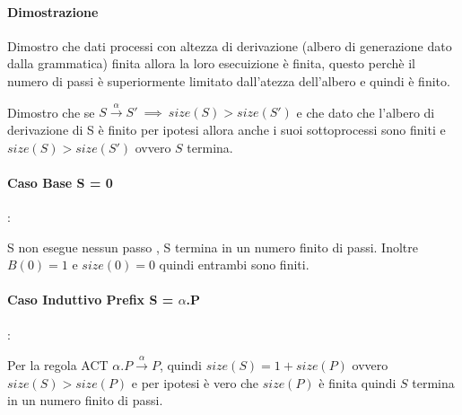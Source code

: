 \documentclass{article}
\newcommand{\passo}{\xrightarrow{\alpha}}
\begin{document}
\paragraph{Dimostrazione} %

Dimostro che dati processi con altezza di derivazione (albero di generazione dato dalla grammatica) finita allora la loro esecuizione è finita, questo perchè il numero di passi è superiormente limitato dall'atezza dell'albero e quindi è finito. 

Dimostro che se $ S \xrightarrow{\alpha}  S' ~ \implies ~ size(S) > size(S') $ e che dato che l'albero di derivazione di S è finito per ipotesi allora anche i suoi sottoprocessi sono finiti e $size(S)>size(S')$ ovvero $S$ termina.



\paragraph{Caso Base S = 0}: 

S non esegue nessun passo%
, S termina in un numero finito di passi. Inoltre $B(0) = 1$ e $size(0) = 0$ quindi entrambi sono finiti.

\paragraph{Caso Induttivo Prefix S = $\alpha$.P}:

Per la regola ACT $\alpha.P \xrightarrow{\alpha}P$, quindi  $size(S) = 1+ size(P)$ ovvero $size(S)>size(P)$ e per ipotesi è vero che $size(P)$ è finita quindi $S$ termina in un numero finito di passi.
\end{document}
